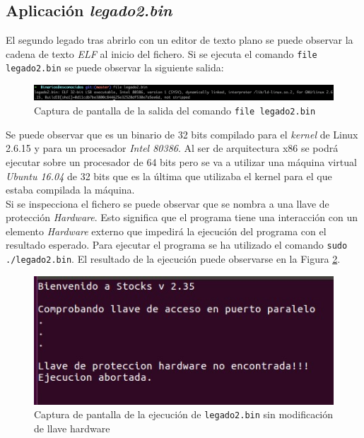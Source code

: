 \documentclass{article}
\begin{document}
\newpage
\subsection{Aplicación \textit{legado2.bin}}

El segundo legado tras abrirlo con un editor de texto plano se puede observar la cadena de texto \textit{ELF} al inicio del fichero. Si se ejecuta el comando \texttt{file legado2.bin} se puede observar la siguiente salida:

\begin{figure}[h!]
    \centering
    \includegraphics[scale=0.5]{images/file_legado2.png}
    \caption{Captura de pantalla de la salida del comando \texttt{file legado2.bin}}
    \label{fig:fileLegado2}
\end{figure}

Se puede observar que es un binario de 32 bits compilado para el \textit{kernel} de Linux 2.6.15 y para un procesador \textit{Intel 80386}. Al ser de arquitectura x86 se podrá ejecutar sobre un procesador de 64 bits pero se va a utilizar una máquina virtual \textit{Ubuntu 16.04} de 32 bits que es la última que utilizaba el kernel para el que estaba compilada la máquina.\\

Si se inspecciona el fichero se puede observar que se nombra a una llave de protección \textit{Hardware}. Esto significa que el programa tiene una interacción con un elemento \textit{Hardware} externo que impedirá la ejecución del programa con el resultado esperado. Para ejecutar el programa se ha utilizado el comando \texttt{sudo ./legado2.bin}. El resultado de la ejecución puede observarse en la Figura \ref{fig:llaveHW_noEnct}.\\

\begin{figure}[h!]
    \centering
    \includegraphics[scale=0.9]{images/llavehw_noenct.jpg}
    \caption{Captura de pantalla de la ejecución de \texttt{legado2.bin} sin modificación de llave hardware}
    \label{fig:llaveHW_noEnct}
\end{figure}\\
\end{document}
